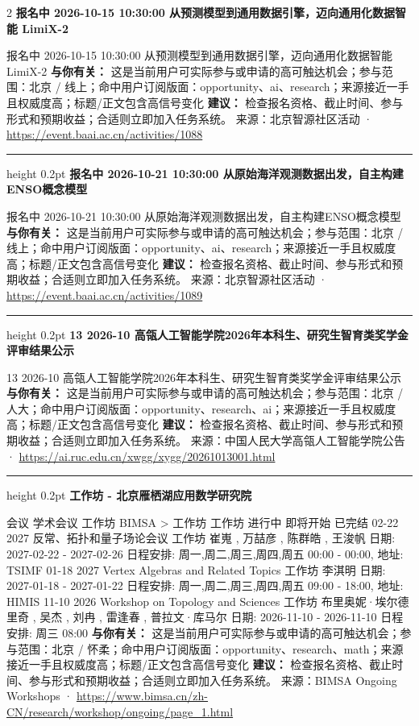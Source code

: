 \documentclass[10.5pt]{ctexart}
\begin{document}
\begin{multicols}{2}
{\large\bfseries 报名中 2026-10-15 10:30:00 从预测模型到通用数据引擎，迈向通用化数据智能 LimiX-2}\par
报名中 2026-10-15 10:30:00 从预测模型到通用数据引擎，迈向通用化数据智能 LimiX-2
\textbf{与你有关：} 这是当前用户可实际参与或申请的高可触达机会；参与范围：北京 / 线上；命中用户订阅版面：opportunity、ai、research；来源接近一手且权威度高；标题/正文包含高信号变化
\textbf{建议：} 检查报名资格、截止时间、参与形式和预期收益；合适则立即加入任务系统。
{\footnotesize\color{ormuted} 来源：北京智源社区活动 · \url{https://event.baai.ac.cn/activities/1088}}
\vspace{2mm}
\hrule height 0.2pt
\vspace{2mm}
{\large\bfseries 报名中 2026-10-21 10:30:00 从原始海‮观洋‬测数据出发，自主构建ENSO概念模型}\par
报名中 2026-10-21 10:30:00 从原始海‮观洋‬测数据出发，自主构建ENSO概念模型
\textbf{与你有关：} 这是当前用户可实际参与或申请的高可触达机会；参与范围：北京 / 线上；命中用户订阅版面：opportunity、ai、research；来源接近一手且权威度高；标题/正文包含高信号变化
\textbf{建议：} 检查报名资格、截止时间、参与形式和预期收益；合适则立即加入任务系统。
{\footnotesize\color{ormuted} 来源：北京智源社区活动 · \url{https://event.baai.ac.cn/activities/1089}}
\vspace{2mm}
\hrule height 0.2pt
\vspace{2mm}
{\large\bfseries 13 2026-10 高瓴人工智能学院2026年本科生、研究生智育类奖学金评审结果公示}\par
13 2026-10 高瓴人工智能学院2026年本科生、研究生智育类奖学金评审结果公示
\textbf{与你有关：} 这是当前用户可实际参与或申请的高可触达机会；参与范围：北京 / 人大；命中用户订阅版面：opportunity、research、ai；来源接近一手且权威度高；标题/正文包含高信号变化
\textbf{建议：} 检查报名资格、截止时间、参与形式和预期收益；合适则立即加入任务系统。
{\footnotesize\color{ormuted} 来源：中国人民大学高瓴人工智能学院公告 · \url{https://ai.ruc.edu.cn/xwgg/xygg/20261013001.html}}
\vspace{2mm}
\hrule height 0.2pt
\vspace{2mm}
{\large\bfseries 工作坊 - 北京雁栖湖应用数学研究院}\par
会议 学术会议 工作坊 BIMSA > 工作坊 工作坊 进行中 即将开始 已完结 02-22 2027 反常、拓扑和量子场论会议 工作坊 崔嵬 , 万喆彦 , 陈群皓 , 王浚帆 日期: 2027-02-22 - 2027-02-26 日程安排: 周一,周二,周三,周四,周五 00:00 - 00:00, 地址: TSIMF 01-18 2027 Vertex Algebras and Related Topics 工作坊 李淇明 日期: 2027-01-18 - 2027-01-22 日程安排: 周一,周二,周三,周四,周五 09:00 - 18:00, 地址: HIMIS 11-10 2026 Workshop on Topology and Sciences 工作坊 布里奥妮·埃尔德里奇 , 吴杰 , 刘冉 , 雷逢春 , 普拉文·库马尔 日期: 2026-11-10 - 2026-11-10 日程安排: 周三 08:00
\textbf{与你有关：} 这是当前用户可实际参与或申请的高可触达机会；参与范围：北京 / 怀柔；命中用户订阅版面：opportunity、research、math；来源接近一手且权威度高；标题/正文包含高信号变化
\textbf{建议：} 检查报名资格、截止时间、参与形式和预期收益；合适则立即加入任务系统。
{\footnotesize\color{ormuted} 来源：BIMSA Ongoing Workshops · \url{https://www.bimsa.cn/zh-CN/research/workshop/ongoing/page_1.html}}
\end{multicols}
\end{document}
